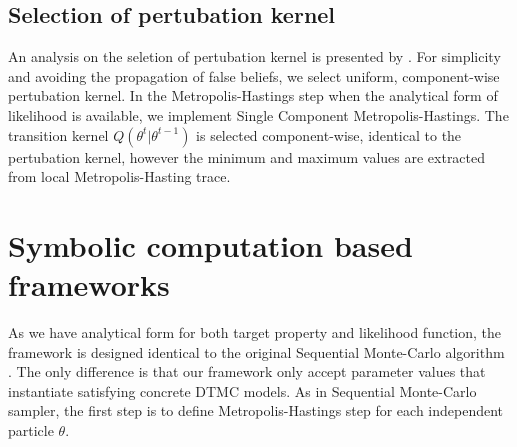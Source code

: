 \subsection{Selection of pertubation kernel}
An analysis on the seletion of pertubation kernel is presented by \cite{silk2012optimizing}. For
simplicity and avoiding the propagation of false beliefs, we select uniform, component-wise
pertubation kernel. In the Metropolis-Hastings step when the analytical form of likelihood is
available, we implement Single Component Metropolis-Hastings. The transition kernel
$Q(\theta^t|\theta^{t-1})$ is selected component-wise, identical to the pertubation kernel, however
the minimum and maximum values are extracted from local Metropolis-Hasting trace.

\section{Symbolic computation based frameworks}
As we have analytical form for both target property and likelihood function, the framework is
designed identical to the original Sequential Monte-Carlo algorithm \cite{del2006sequential}. The
only difference is that our framework only accept parameter values that instantiate satisfying
concrete DTMC models. As in Sequential Monte-Carlo sampler, the first step is to define
Metropolis-Hastings step for each independent particle $\theta$.
